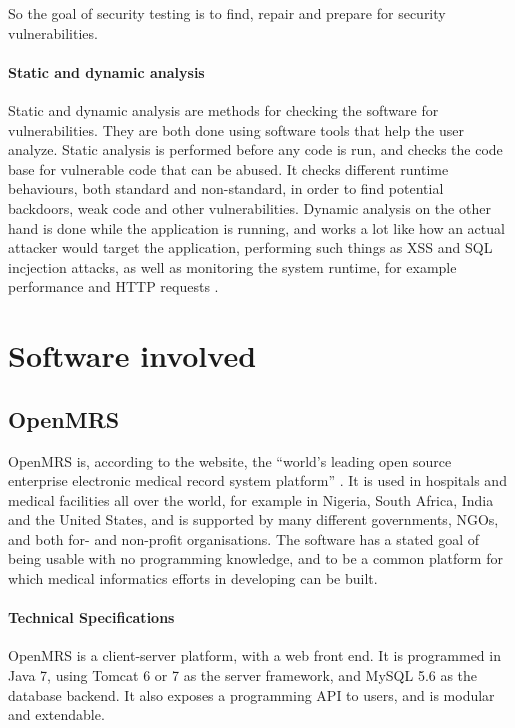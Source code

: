 \documentclass{article}
\begin{document}
  So the goal of security testing is to find, repair and prepare for security
  vulnerabilities.
  
  \paragraph{Static and dynamic analysis}

  Static and dynamic analysis are methods for checking the software for vulnerabilities.
  They are both done using software tools that help the user analyze. Static
  analysis is performed before any code is run, and checks the code base for
  vulnerable code that can be abused. It checks different runtime behaviours,
  both standard and non-standard, in order to find potential backdoors, weak
  code and other vulnerabilities. Dynamic analysis on the other hand is done
  while the application is running, and works a lot like how an actual attacker
  would target the application, performing such things as XSS and SQL incjection
  attacks, as well as monitoring the system runtime, for example performance and
  HTTP requests \autocite[]{VERACODE}.

\newpage
\section{Software involved}
  
\subsection{OpenMRS}

  OpenMRS is, according to the website, the ``world's leading open source
  enterprise electronic medical record system platform'' \autocite[]{OpenMRSAbout}. It is used in
  hospitals and medical facilities all over the world, for example in Nigeria, South Africa, India
  and the United States, and is supported by many different governments, NGOs,
  and both for- and non-profit organisations. The software has a stated goal of
  being usable with no programming knowledge, and to be a common platform for
  which medical informatics efforts in developing can be built.

  \paragraph{Technical Specifications}

  OpenMRS is a client-server platform, with a web front end. It is programmed in
  Java 7, using Tomcat 6 or 7 as the server framework, and MySQL 5.6 as the
  database backend. It also exposes a programming API to users, and is modular
  and extendable.
\end{document}
